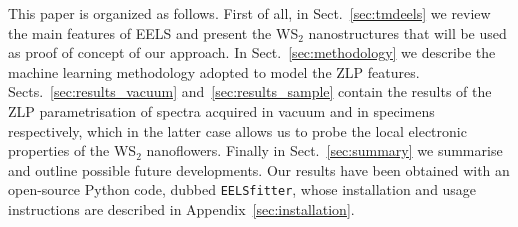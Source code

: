 This paper is organized as follows.
%
First of all, in Sect.~\ref{sec:tmdeels}
we review the main features of EELS and present
the WS$_2$ nanostructures that will be used as proof of concept of our approach.
%
In Sect.~\ref{sec:methodology} we describe the machine learning methodology
adopted to model the ZLP features.
%
Sects.~\ref{sec:results_vacuum} and~\ref{sec:results_sample} contain
the results of the ZLP parametrisation of spectra acquired
in vacuum and in specimens respectively, which in the latter
case allows us to probe the local electronic properties 
of the WS$_2$ nanoflowers.
%
Finally in Sect.~\ref{sec:summary} we summarise
and outline possible future developments.
%
Our results have been obtained with an open-source {\sc Python} code,
dubbed {\tt EELSfitter}, whose installation and usage instructions
are described in Appendix~\ref{sec:installation}.
